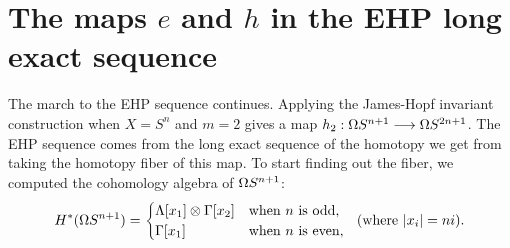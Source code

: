 \section{The maps \texorpdfstring{$e$ and $h$}{e and h} in the EHP long exact sequence} %
\label{TheMapsEandHinTheEHPLES}
\ifx\OutputTheMapsEandHinTheEHPLES\undefined\else
The march to the EHP sequence continues.
Applying the James-Hopf invariant construction when $X = S^n$ and $m = 2$ gives a map $h_2: \Omega S^{n+1} \longrightarrow \Omega S^{2n+1}$.  The EHP sequence comes from the long exact sequence of the homotopy we get from taking the homotopy fiber of this map.  To start finding out the fiber, we computed the cohomology algebra of $\Omega S^{n+1}$:
\[
H^* (\Omega S^{n+1}) = \begin{cases} \Lambda[x_1] \otimes \Gamma[x_2] & \hbox{when $n$ is odd}, \\ \Gamma[x_1] & \hbox{when $n$ is even}, \end{cases}\textup{\ \ (where $|x_i| = ni$).}
\]


